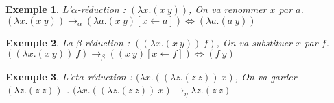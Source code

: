 \documentclass[10pt,a4paper]{report}
\newtheorem{ex}{Exemple}
\begin{document}
\begin{ex} 
	L'$\alpha$-réduction : $(\lambda x.(x~y)) $, On va renommer $x$ par $a$. $(\lambda x.(x~y)) \rightarrow_{\alpha} (\lambda a.(x~y)[x \leftarrow a]) \Longleftrightarrow (\lambda a.(a~y))$ 	
\end{ex}

\begin{ex}
	La $\beta$-réduction : $((\lambda x.(x~y))~f)$, On va substituer $x$ par $f$. $((\lambda x.(x~y))~f) \rightarrow_{\beta} ((x~y)[x \leftarrow f]) \Longleftrightarrow (f~y)$ 
\end{ex}

\begin{ex}
	L'$eta$-réduction : $(\lambda x.((\lambda z.(z~z))~x)$, On va garder $(\lambda z.(z~z))$ . $(\lambda x.((\lambda z.(z~z))~x) \rightarrow_{\eta} \lambda z.(z~z)$ 
\end{ex}
\end{document}
